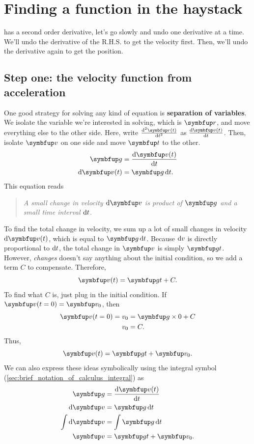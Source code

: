 \section{Finding a function in the haystack}
\label{sec:function_in_the_haystack}

 has a second order derivative, let's go slowly and undo one derivative at a time. We'll undo the derivative of the R.H.S. to get the velocity first. Then, we'll undo the derivative again to get the position.

\subsection{Step one: the velocity function from acceleration}

One good strategy for solving any kind of equation is \textbf{separation of variables}. We isolate the variable we're interested in solving, which is \(\vv{r}\), and move everything else to the other side. Here, write \(\odv[ord = 2]{\vv{r}(t)}{t}\) as \(\odv{\vv{v}(t)}{t}\). Then, isolate \(\vv{v}\) on one side and move \(\vv{t}\) to the other.
\begin{align}
  \vv{g}           & = \odv{\vv{v}(t)}{t} \\
  \odif{\vv{v}}(t) & = \vv{g}\odif{t}.
\end{align}
This equation reads
\begin{quotation}
  \emph{A small change in velocity \(\odif{\vv{v}}\) is product of \(\vv{g}\) and a small time interval \(\odif{t}\).}
\end{quotation}

To find the total change in velocity, we sum up a lot of small changes in velocity \(\odif{\vv{v}}(t)\), which is equal to \(\vv{g}\odif{t}\). Because \(\odif{v}\) is directly proportional to \(\odif{t}\), the total change in \(\vv{v}\) is simply \(\vv{g}t\). However, \emph{changes} doesn't say anything about the initial condition, so we add a term \(C\) to compensate. Therefore,
\begin{equation}
  \vv{v}(t) = \vv{g}t + C.
\end{equation}
To find what \(C\) is, just plug in the initial condition. If \(\vv{v}(t = 0) = \vv{v}_0\), then
\begin{align}
  \vv{v}(t = 0) = v_0 & = \vv{g}\times 0 + C \\
  v_0                 & = C.
\end{align}
Thus,
\begin{equation}
  \vv{v}(t) = \vv{g}t + \vv{v}_0.
\end{equation}
We can also express these ideas symbolically using the integral symbol (\cref{sec:brief_notation_of_calculus_integral}) as
\begin{align}
  \vv{g}            & = \odv{\vv{v}(t)}{t}                           \\
  \odif{\vv{v}}     & = \vv{g}\odif{t}                               \\
  \int\odif{\vv{v}} & = \int \vv{g}\odif{t}                          \\
  \vv{v}            & = \vv{g}t + \vv{v}_0. \label{eq:simplemotionr}
\end{align}

